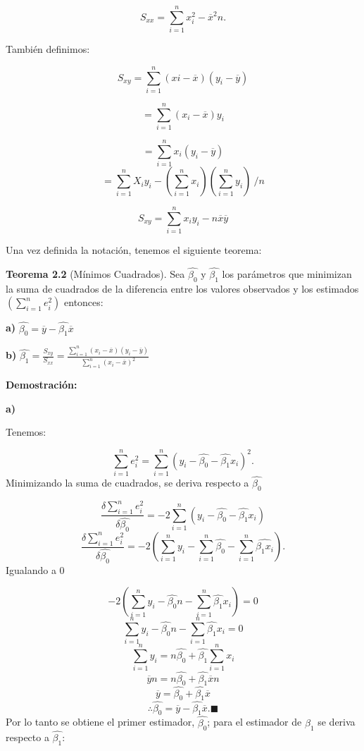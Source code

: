 \documentclass[
  a4paper,
  oneside,
  openany]{book}
\begin{document}
\[S_{xx}=\sum_{i=1}^{n}x_{i}^2-\overline{x}^2n.\]

También definimos:

\[S_{xy}=\sum_{i=1}^{n}(xi-\overline{x})(y_{i}-\overline{y})\]

\[=\sum_{i=1}^{n}(x_{i}-\overline{x})y_{i}\]

\[=\sum_{i=1}^{n}x_{i}(y_{i}-\overline{y})\]
\[=\sum_{i=1}^{n}X_{i}y_{i}-\left(\sum_{i=1}^{n}x_{i}\right) \left(\sum_{i=1}^{n}y_{i}\right) \ /{n}\]

\[S_{xy}=\sum_{i=1}^{n}x_{i}y_{i}-n\overline{x}\overline{y}\]

Una vez definida la notación, tenemos el siguiente teorema:

\textbf{Teorema 2.2} (Mínimos Cuadrados). Sea \(\hat{\beta_0}\) y \(\hat{\beta_{1}}\) los parámetros que minimizan la suma de cuadrados de la diferencia entre los valores observados y los estimados \(\left(\sum_{i=1}^{n}e_i^2\right)\) entonces:

\textbf{a)} \(\hat{\beta_{0}}=\overline{y}-\hat{\beta_{1}}\overline{x}\)

\textbf{b)} \(\hat{\beta_{1}}=\frac{S_{xy}}{S_{xx}}=\frac{\sum_{i=1}^{n}(x_{i}-\overline{x})(y_{i}-\overline{y})}{\sum_{i=1}^{n}(x_{i}-\overline{x})^2}\)

\textbf{Demostración:}

\textbf{a)}

Tenemos:

\[\sum_{i=1}^{n}e_{i}^2=\sum_{i=1}^{n}(y_{i}-\hat{\beta_{0}}-\hat{\beta_{1}}x_{i})^2.\]
Minimizando la suma de cuadrados, se deriva respecto a \(\hat{\beta_{0}}\)

\[\frac{\delta\sum_{i=1}^{n}e_{i}^2}{\delta\hat{\beta_{0}}}=-2\sum_{i=1}^{n}(y_{i}-\hat{\beta_{0}}-\hat{\beta_{1}}x_{i})\]
\[\frac{\delta\sum_{i=1}^{n}e_{i}^2}{\delta\hat{\beta_{0}}}=-2\left(\sum_{i=1}^{n}y_{i}-\sum_{i=1}^{n}\hat{\beta_{0}}-\sum_{i=1}^{n}\hat{\beta_{1}x_{i}}\right).\]
Igualando a 0

\[-2\left(\sum_{i=1}^{n}y_{i}-\hat{\beta_{0}}n-\sum_{i=1}^{n}\hat{\beta_{1}}x_{i}\right)=0\]
\[\sum_{i=1}^{n}y_{i}-\hat{\beta_{0}}n-\sum_{i=1}^{n}\hat{\beta_{1}}x_{i}=0\]
\[\sum_{i=1}^{n}y_{i}=n\hat{\beta_{0}}+\hat{\beta_{1}}\sum_{i=1}^{n}x_{i}\]
\[\overline{y}n=n\hat{\beta_{0}}+\hat{\beta_{1}}\overline{x}n\]
\[\overline{y}=\hat{\beta_{0}}+\hat{\beta_{1}}\overline{x}\]
\[\therefore\hat{\beta_{0}}=\overline{y}-\hat{\beta_{1}}\overline{x}.\blacksquare\]
Por lo tanto se obtiene el primer estimador, \(\hat{\beta_{0}}\); para el estimador de \(\beta_{1}\) se deriva respecto a \(\hat{\beta_{1}}\):
\end{document}
